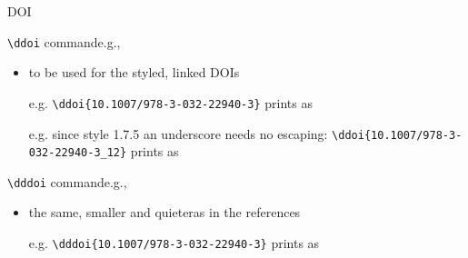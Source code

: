 \begin{frame}[c,fragile]{DOI}
%
\begin{block}{\texttt{\textbackslash{}ddoi} command\textemdash{}e.g., } %
\begin{itemize}
	\item to be used for the styled, linked DOIs
	\item[e.g.] \verb|\ddoi{10.1007/978-3-032-22940-3}| prints as  %
	\item[e.g.] since style 1.7.5 an underscore needs no escaping: \verb|\ddoi{10.1007/978-3-032-22940-3_12}| prints as  %
\end{itemize}
\end{block}
%
\begin{block}{\texttt{\textbackslash{}dddoi} command\textemdash{}e.g., } %
\begin{itemize}
	\item the same, smaller and quieter\textemdash{}as in the references
	\item[e.g.] \verb|\dddoi{10.1007/978-3-032-22940-3}| prints as  %
\end{itemize}
\end{block}
%
\end{frame}

